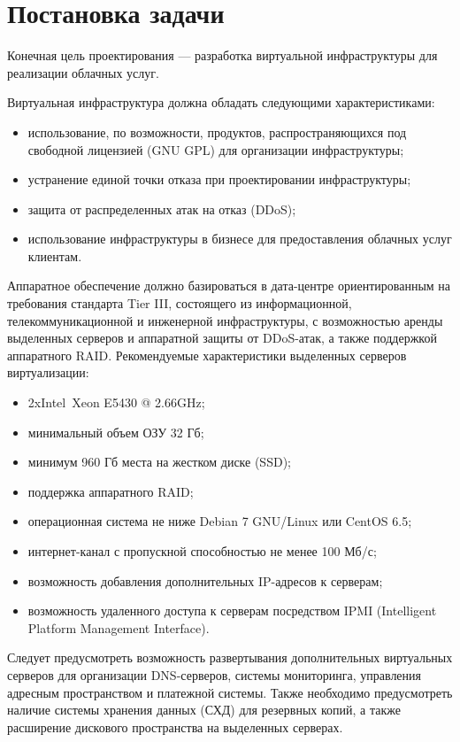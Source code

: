 \section{Постановка задачи}

Конечная цель проектирования --- разработка виртуальной инфраструктуры для реализации облачных услуг.

Виртуальная инфраструктура должна обладать следующими характеристиками:
\begin{itemize}
    \item использование, по возможности, продуктов, распространяющихся под свободной лицензией (GNU GPL) для организации инфраструктуры;
    \item устранение единой точки отказа при проектировании инфраструктуры;
    \item защита от распределенных атак на отказ (DDoS);
    \item использование инфраструктуры в бизнесе для предоставления облачных услуг клиентам.
\end{itemize}

Аппаратное обеспечение должно базироваться в дата-центре ориентированным на требования стандарта Tier III, состоящего из информационной, телекоммуникационной и инженерной инфраструктуры, с возможностью аренды выделенных серверов и аппаратной защиты от DDoS-атак, а также поддержкой аппаратного RAID.
Рекомендуемые характеристики выделенных серверов виртуализации:
\begin{itemize}
    \item 2xIntel\textregistered~Xeon E5430 @ 2.66GHz;
    \item минимальный объем ОЗУ 32 Гб;
    \item минимум 960 Гб места на жестком диске (SSD);
    \item поддержка аппаратного RAID;
    \item операционная система не ниже Debian 7 GNU/Linux или CentOS 6.5;
    \item интернет-канал с пропускной способностью не менее 100 Мб/с;
    \item возможность добавления дополнительных IP-адресов к серверам;
    \item возможность удаленного доступа к серверам посредством IPMI (Intelligent Platform Management Interface).
\end{itemize}

Следует предусмотреть возможность развертывания дополнительных виртуальных серверов для организации DNS-серверов, системы мониторинга, управления адресным пространством и платежной системы.
Также необходимо предусмотреть наличие системы хранения данных (СХД) для резервных копий, а также расширение дискового пространства на выделенных серверах.

